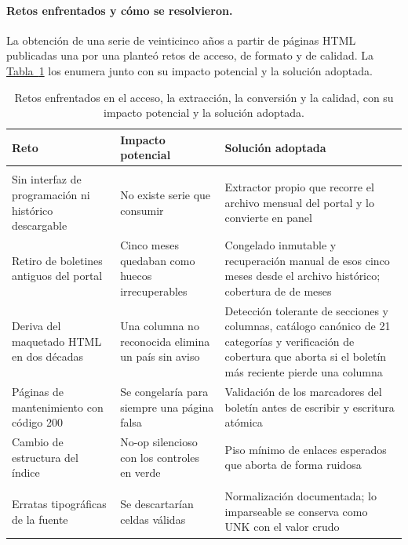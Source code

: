 \documentclass[12pt,letterpaper]{report}
\begin{document}
\paragraph{Retos enfrentados y cómo se resolvieron.} La obtención de una serie de
veinticinco años a partir de páginas HTML publicadas una por una planteó retos de acceso,
de formato y de calidad. La \hyperref[tab:retos]{Tabla~\ref*{tab:retos}} los enumera junto con su impacto potencial y
la solución adoptada.

\begin{table}[htbp]
\centering
\footnotesize
\caption[Retos enfrentados y soluciones]{Retos enfrentados en el acceso, la extracción, la
conversión y la calidad, con su impacto potencial y la solución adoptada.}
\label{tab:retos}
\begin{tabular}{>{\raggedright\arraybackslash}p{3.5cm}>{\raggedright\arraybackslash}p{3.6cm}>{\raggedright\arraybackslash}p{6.4cm}}
\toprule
\rowcolor{uacjblue!15}
\textbf{Reto} & \textbf{Impacto potencial} & \textbf{Solución adoptada} \\ \midrule
\multicolumn{3}{l}{\textit{Acceso y extracción}} \\
Sin interfaz de programación ni histórico descargable & No existe serie que consumir & Extractor propio que recorre el archivo mensual del portal y lo convierte en panel \\
Retiro de boletines antiguos del portal & Cinco meses quedaban como huecos irrecuperables & Congelado inmutable y recuperación manual de esos cinco meses desde el archivo histórico; cobertura de \factNMonths{} de \factNMonths{} meses \\
Deriva del maquetado HTML en dos décadas & Una columna no reconocida elimina un país sin aviso & Detección tolerante de secciones y columnas, catálogo canónico de 21 categorías y verificación de cobertura que aborta si el boletín más reciente pierde una columna \\
Páginas de mantenimiento con código 200 & Se congelaría para siempre una página falsa & Validación de los marcadores del boletín antes de escribir y escritura atómica \\
Cambio de estructura del índice & No-op silencioso con los controles en verde & Piso mínimo de enlaces esperados que aborta de forma ruidosa \\
\multicolumn{3}{l}{\textit{Conversión y calidad}} \\
Erratas tipográficas de la fuente & Se descartarían celdas válidas & Normalización documentada; lo imparseable se conserva como UNK con el valor crudo \\

\end{tabular}
\end{table}
\end{document}
